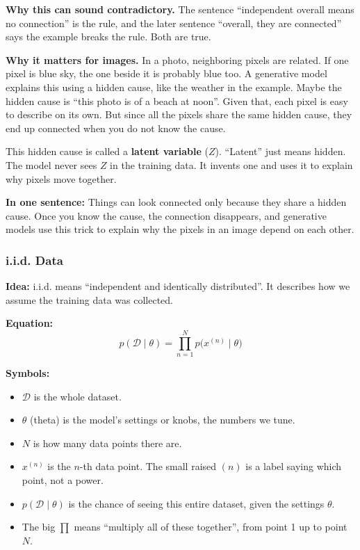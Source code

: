 \textbf{Why this can sound contradictory.} The sentence ``independent overall means no connection'' is the rule, and the later sentence ``overall, they are connected'' says the example breaks the rule. Both are true.

\textbf{Why it matters for images.} In a photo, neighboring pixels are related. If one pixel is blue sky, the one beside it is probably blue too. A generative model explains this using a hidden cause, like the weather in the example. Maybe the hidden cause is ``this photo is of a beach at noon''. Given that, each pixel is easy to describe on its own. But since all the pixels share the same hidden cause, they end up connected when you do not know the cause.

This hidden cause is called a \textbf{latent variable} ($Z$). ``Latent'' just means hidden. The model never sees $Z$ in the training data. It invents one and uses it to explain why pixels move together.

\textbf{In one sentence:} Things can look connected only because they share a hidden cause. Once you know the cause, the connection disappears, and generative models use this trick to explain why the pixels in an image depend on each other.

\subsubsection*{i.i.d. Data}

\textbf{Idea:} i.i.d. means ``independent and identically distributed''. It describes how we assume the training data was collected.

\textbf{Equation:}
\[
p(\mathcal{D} \mid \theta) = \prod_{n=1}^{N} p\bigl(x^{(n)} \mid \theta\bigr)
\]

\textbf{Symbols:}
\begin{itemize}
  \item $\mathcal{D}$ is the whole dataset.
  \item $\theta$ (theta) is the model's settings or knobs, the numbers we tune.
  \item $N$ is how many data points there are.
  \item $x^{(n)}$ is the $n$-th data point. The small raised $(n)$ is a label saying which point, not a power.
  \item $p(\mathcal{D} \mid \theta)$ is the chance of seeing this entire dataset, given the settings $\theta$.
  \item The big $\prod$ means ``multiply all of these together'', from point 1 up to point $N$.
\end{itemize}

